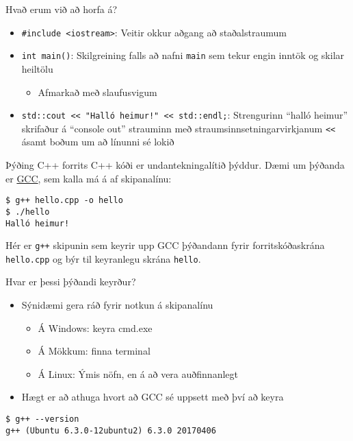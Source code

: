 \documentclass[handout]{beamer}
\begin{document}
\begin{frame}[fragile]{Hvað erum við að horfa á?}
    \begin{itemize}
        \item \texttt{\#include <iostream>}: Veitir okkur aðgang að staðalstraumum
        \item \texttt{int main()}: Skilgreining falls að nafni \texttt{main} sem tekur engin inntök og skilar heiltölu
        \begin{itemize}
            \item Afmarkað með slaufusvigum
        \end{itemize}
        \item \verb|std::cout << "Halló heimur!" << std::endl;|: Strengurinn ``halló heimur'' skrifaður á ``console out'' strauminn með straumsinnsetningarvirkjanum \verb|<<| ásamt boðum um að línunni sé lokið
    \end{itemize}
\end{frame}

\begin{frame}[fragile]{Þýðing C++ forrits}
    C++ kóði er undantekningalítið þýddur. Dæmi um þýðanda er \href{https://gcc.gnu.org/}{GCC}, sem kalla má á af skipanalínu:
    \begin{verbatim}
$ g++ hello.cpp -o hello
$ ./hello
Halló heimur!
    \end{verbatim}
    Hér er \texttt{g++} skipunin sem keyrir upp GCC þýðandann fyrir forritskóðaskrána \texttt{hello.cpp} og býr til keyranlegu skrána \texttt{hello}.
\end{frame}

\begin{frame}[fragile]{Hvar er þessi þýðandi keyrður?}
    \begin{itemize}
        \item Sýnidæmi gera ráð fyrir notkun á skipanalínu 
        \begin{itemize}
            \item Á Windows: keyra cmd.exe
            \item Á Mökkum: finna terminal
            \item Á Linux: Ýmis nöfn, en á að vera auðfinnanlegt
        \end{itemize}
        \item Hægt er að athuga hvort að GCC sé uppsett með því að keyra
    \end{itemize}
    \begin{verbatim}
$ g++ --version
g++ (Ubuntu 6.3.0-12ubuntu2) 6.3.0 20170406
    \end{verbatim}
\end{frame}
\end{document}
